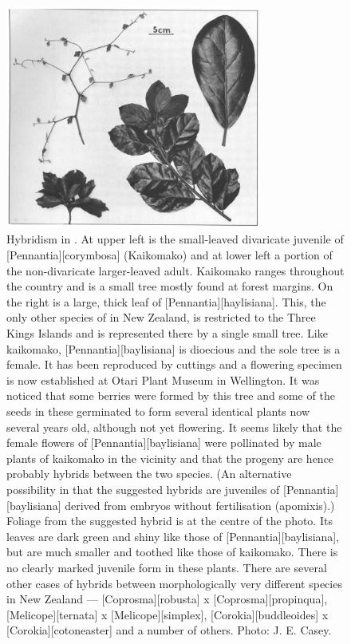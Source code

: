 \begin{figure}[!htb]
	\centering
	\includegraphics[width=0.75\textwidth]{graphics/figure79pennantia.jpg}
	\caption[Hybridism in Pennantia]{Hybridism in .
	At upper left is the small-leaved divaricate juvenile of [Pennantia][corymbosa] (Kaikomako) and at lower left a portion of the non-divaricate larger-leaved adult.
	Kaikomako ranges throughout the country and is a small tree mostly found at forest margins.
	On the right is a large, thick leaf of [Pennantia][haylisiana].
	This, the only other species of  in New Zealand, is restricted to the Three Kings Islands and is represented there by a single small tree.
	Like kaikomako, [Pennantia][baylisiana] is dioecious and the sole tree is a female.
	It has been reproduced by cuttings and a flowering specimen is now established at Otari Plant Museum in Wellington.
	It was noticed that some berries were formed by this tree and some of the seeds in these germinated to form several identical plants now several years old, although not yet flowering.
	It seems likely that the female flowers of [Pennantia][baylisiana] were pollinated by male plants of kaikomako in the vicinity and that the progeny are hence probably hybrids between the two species. (An alternative possibility in that the suggested hybrids are juveniles of [Pennantia][baylisiana] derived from embryos without fertilisation (apomixis).) Foliage from the suggested hybrid is at the centre of the photo.
	Its leaves are dark green and shiny like those of [Pennantia][baylisiana], but are much smaller and toothed like those of kaikomako.
	There is no clearly marked juvenile form in these plants.
	There are several other cases of hybrids between morphologically very different species in New Zealand --- [Coprosma][robusta] x [Coprosma][propinqua], [Melicope][ternata] x [Melicope][simplex], [Corokia][buddleoides] x [Corokia][cotoneaster] and a number of others.
	Photo:  J. E. Casey.}%
	\label{fig:79pennantia}
\end{figure}


